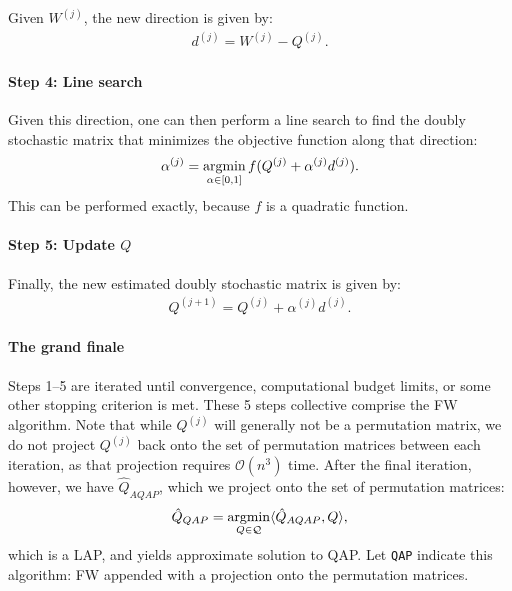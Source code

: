 \documentclass{article} %
\newcommand{\argmin}{\operatornamewithlimits{argmin}}
\providecommand{\mc}[1]{\mathcal{#1}}
\providecommand{\mh}[1]{\hat{#1}}
\newcommand{\qap}{\texttt{QAP} }
\begin{document}
Given $W^{(j)}$, the new direction is given by:
\begin{align}
	d^{(j)}=W^{(j)}-Q^{(j)}.
\end{align}


\paragraph{Step 4: Line search} %
\label{par:step_4_line_search}


Given this direction, one can then perform a line search to find the doubly stochastic matrix that minimizes the objective function along that direction:
\begin{align}
	\alpha^{(j)} = \argmin_{\alpha \in [0,1]} f(Q^{(j)} + \alpha^{(j)} d^{(j)}).
\end{align}
This can be performed exactly, because $f$ is a quadratic function.  


\paragraph{Step 5: Update $Q$} %
\label{par:step_5_update_q_}

Finally, the new estimated doubly stochastic matrix is given by:
\begin{align}\label{eq:update}
	Q^{(j+1)} = Q^{(j)} + \alpha^{(j)} d^{(j)}.
\end{align}


\paragraph{The grand finale} %
\label{par:the_final_iteration}

Steps 1--5 are iterated until convergence, computational budget limits, or some other stopping criterion is met.  These 5 steps collective comprise the FW algorithm.  Note that while $Q^{(j)}$ will generally not be a permutation matrix, we do not project $Q^{(j)}$ back onto the set of permutation matrices between each iteration, as that projection requires $\mc{O}(n^3)$ time. After the final iteration, however, we have $\mh{Q}_{AQAP}$, which we project onto the set of permutation matrices:
\begin{align} \label{eq:proj}
	\mh{Q}_{QAP} = \argmin_{Q \in \mc{Q}} \langle \mh{Q}_{AQAP}, Q \rangle,
\end{align}
which is a LAP, and yields approximate solution to QAP.  Let \qap indicate this algorithm: FW appended with a projection onto the permutation matrices.
\end{document}

